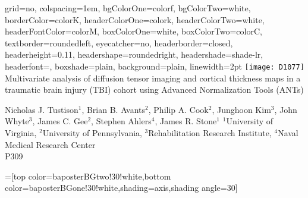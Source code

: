 \documentclass[paperwidth=48in,paperheight=48in,portrait,final]{baposter}
\begin{document}
\newlength{\leftimgwidth}
\begin{poster}%
  {
  grid=no,
  colspacing=1em,
  bgColorOne=colorf,
  bgColorTwo=white,
  borderColor=colorK,
  headerColorOne=colork,
  headerColorTwo=white,
  headerFontColor=colorM,
  boxColorOne=white,
  boxColorTwo=colorC,
  textborder=roundedleft,
  eyecatcher=no,
  headerborder=closed,
  headerheight=0.11\textheight,
  headershape=roundedright,
  headershade=shade-lr,
  headerfont=\Large, %
  boxshade=plain,
  background=plain,
  linewidth=2pt
  }
  {\texttt{[image: D1077]}} %
  { %
  Multivariate analysis of diffusion tensor imaging and cortical thickness maps in a traumatic brain injury (TBI) cohort using Advanced Normalization Tools (ANTs)
  \vspace{0.1em}}
  { %
  Nicholas J. Tustison$^1$, Brian B. Avants$^2$, Philip A. Cook$^2$, Junghoon Kim$^3$, John Whyte$^3$, James C. Gee$^2$, Stephen  Ahlers$^4$, James R. Stone$^1$ \newline
  {\normalsize $^1$University of Virginia, $^2$University of Pennsylvania, $^3$Rehabilitation Research Institute, $^4$Naval Medical Research Center \\
  P309
  }
  
  }
  {%
  }

  =[top color=baposterBGtwo!30!white,bottom color=baposterBGone!30!white,shading=axis,shading angle=30]

     \setlength{\leftimgwidth}{0.78em+8.0em}

    \newcommand{\colouredcircle}[1]{%
      \tikz{\useasboundingbox (-0.2em,-0.32em) rectangle(0.2em,0.32em); \draw[draw=black,fill=baposterBGone!80!black!#1!white,line width=0.03em] (0,0) circle(0.18em);}}


\end{poster}
\end{document}
